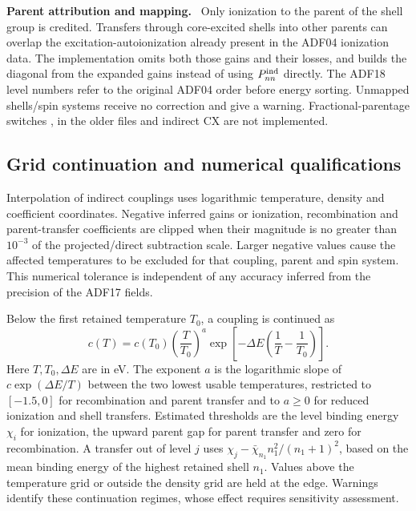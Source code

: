 \documentclass[11pt,a4paper]{article}
\newcommand{\code}[1]{\texttt{\detokenize{#1}}}
\newenvironment{implnote}[1][Implementation]{%
  \par\smallskip\noindent\begin{lrbox}{\notebox}\setlength{\fboxsep}{6pt}\begin{minipage}{\dimexpr\linewidth-2\fboxsep-2\fboxrule\relax}\small\textbf{#1.}\ }{%
  \end{minipage}\end{lrbox}\setlength{\fboxsep}{6pt}\fcolorbox{noteframe}{notebg}{\usebox{\notebox}}\par\smallskip}
\numberwithin{equation}{section}
\begin{document}
\begin{implnote}[Parent attribution and mapping]
Only ionization to the parent of the shell group is credited. Transfers
through core-excited shells into other parents can overlap the
excitation-autoionization already present in the ADF04 ionization data.
The implementation omits both those gains and their losses, and builds
the diagonal from the expanded gains instead of using $P^{\rm ind}_{nn}$ directly.
The ADF18 level numbers refer to the original ADF04 order before energy
sorting. Unmapped shells/spin systems receive no correction and give a
warning. Fractional-parentage switches \code{IEFPRE}, \code{IEFPRS}
in the older \code{cbnm93} files and indirect CX are not implemented.
\end{implnote}

\subsection{Grid continuation and numerical qualifications}

Interpolation of indirect couplings uses logarithmic temperature,
density and coefficient coordinates. Negative inferred gains or
ionization, recombination and parent-transfer coefficients are
clipped when their magnitude is no greater than $10^{-3}$ of the
projected/direct subtraction scale. Larger negative values cause
the affected temperatures to be excluded for that coupling, parent
and spin system. This numerical tolerance is independent of any
accuracy inferred from the precision of the ADF17 fields.

Below the first retained temperature $T_0$, a coupling is continued as
\begin{equation}\label{eq:projection-below}
 c(T)=c(T_0)\left(\frac{T}{T_0}\right)^a
 \exp\left[-\Delta E\left(\frac1T-\frac1{T_0}\right)\right].
\end{equation}
Here $T,T_0,\Delta E$ are in eV. The exponent $a$ is the logarithmic
slope of $c\exp(\Delta E/T)$ between the two lowest usable
temperatures, restricted to $[-1.5,0]$ for recombination and parent
transfer and to $a\ge0$ for reduced ionization and shell transfers.
Estimated thresholds are the level binding energy $\chi_i$ for
ionization, the upward parent gap for parent transfer and zero for
recombination. A transfer out of level $j$ uses
$\chi_j-\bar\chi_{n_1}n_1^2/(n_1+1)^2$, based on the mean binding
energy of the highest retained shell $n_1$. Values above the
temperature grid or outside the density grid are held at the edge.
Warnings identify these continuation regimes, whose effect requires
sensitivity assessment.
\end{document}
